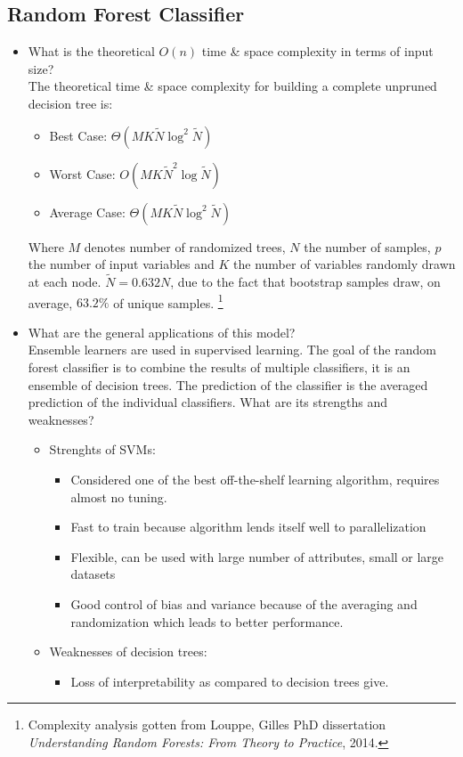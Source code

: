 \documentclass[12pt]{article}
\begin{document}
\subsection*{Random Forest Classifier}
\begin{itemize} 
\item What is the theoretical $O(n)$ time \& space complexity in terms of input size?\\
The theoretical time \& space complexity for building a complete unpruned decision tree is:
\begin{itemize}[noitemsep,nolistsep]
\item Best Case: $\Theta(MK\widetilde{N}\log^2 \widetilde{N})$ 
\item Worst Case: $O(MK\widetilde{N}^2\log \widetilde{N})$ 
\item Average Case: $\Theta(MK\widetilde{N}\log^2 \widetilde{N})$
\end{itemize}
Where $M$ denotes number of randomized trees, $N$ the number of samples, $p$ the number of input variables and $K$ the number of variables randomly drawn at each node. $\widetilde{N} = 0.632 N$, due to the fact that bootstrap samples draw, on average, $63.2\%$ of unique samples. 
\footnote{Complexity analysis gotten from Louppe, Gilles PhD dissertation \textit{Understanding Random Forests: From Theory to Practice}, 2014.}

\item What are the general applications of this model?\\
Ensemble learners are used in supervised learning. The goal of the random forest classifier is to combine the results of multiple classifiers, it is an ensemble of decision trees. The prediction of the classifier is the averaged prediction of the individual classifiers. 
What are its strengths and weaknesses?\\
\begin{itemize}[noitemsep,nolistsep]
       \item Strenghts of SVMs:
              \begin{itemize}[noitemsep,nolistsep]
                     \item Considered one of the best off-the-shelf learning algorithm, requires almost no tuning. 
                     \item Fast to train because algorithm lends itself well to parallelization
                     \item Flexible, can be used with large number of attributes, small or large datasets
                     \item Good control of bias and variance because of the averaging and randomization which leads to better performance.
              \end{itemize}
       \item Weaknesses of decision trees:
              \begin{itemize}[noitemsep,nolistsep]
                     \item Loss of interpretability as compared to decision trees give.
              \end{itemize}
       \end{itemize}



\end{itemize}
\end{document}
